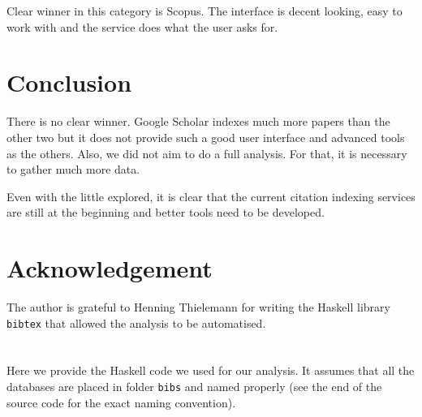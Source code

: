 \documentclass{lmcs}
\begin{document}
Clear winner in this category is Scopus. The interface is decent looking, easy to work with and the service does what the user asks for.

\section{Conclusion}

There is no clear winner. Google Scholar indexes much more papers than the other two but it does not provide such a good user interface and advanced tools as the others. Also, we did not aim to do a full analysis. For that, it is necessary to gather much more data.

Even with the little explored, it is clear that the current citation indexing services are still at the beginning and better tools need to be developed.

\section*{Acknowledgement}
  The author is grateful to Henning Thielemann for writing the Haskell library \texttt{bibtex} that allowed the analysis to be automatised.




\appendix
\section{}
\label{app:A}

Here we provide the Haskell code we used for our analysis. It assumes that all the \BibTeX{} databases are placed in folder \texttt{bibs} and named properly (see the end of the source code for the exact naming convention).


\end{document}
